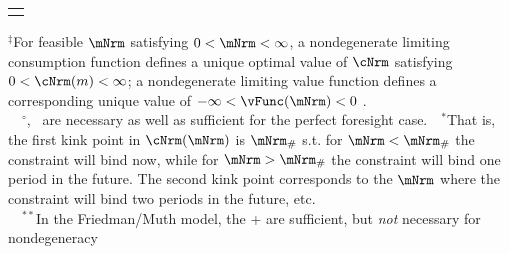 \begin{table}
{\begin{tabular}{|l|l|l|}
        \\ \hline \multicolumn{3}{c}{}
      \end{tabular}
    } %

    \settowidth\TableWidth{\usebox{\TblBox}}
    \savebox{\TblShrunkBox}{
      \settowidth{\TblShrunk}{\usebox{\TblBox}}
      \resizebox{\textwidth}{!}{\begin{minipage}{\TblShrunk}
          \usebox{\TblBox}
        \end{minipage}}
    }

    \usebox{\TblShrunkBox}


    \parbox{\textwidth}{\raggedright \footnotesize         $^{\ddagger}$For feasible $\mNrm$ satisfying $0 < \mNrm < \infty$, a nondegenerate limiting consumption function defines a unique optimal value of $\cNrm$ satisfying $0 < \cNrm(m) < \infty$; a nondegenerate limiting value function defines a corresponding unique value of $-\infty < \vFunc(\mNrm) < 0$ .\\
      ~~$^{\circ}${\RIC}, \FHWC~are necessary as well as sufficient for the perfect foresight case.~~$^{\ast}$That is, the first kink point in $\cNrm(\mNrm)$ is $\mNrm_{\#}$ s.t.
for $\mNrm < \mNrm_{\#}$ the constraint will bind now, while for $\mNrm > \mNrm_{\#}$ the constraint will bind one period in the future.
The second kink point corresponds to the $\mNrm$ where the constraint will bind two periods in the future, etc.\\
      ~~$^{\ast\ast}$In the Friedman/Muth model, the {\RIC}+{\FHWC} are sufficient, but \textit{not} necessary for nondegeneracy}
  \end{table}

